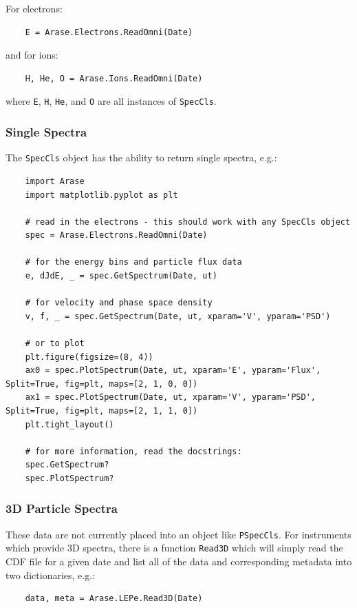	For electrons:
	\begin{verbatim}
	E = Arase.Electrons.ReadOmni(Date)
	\end{verbatim}
	and for ions:
	\begin{verbatim}
	H, He, O = Arase.Ions.ReadOmni(Date)
	\end{verbatim}
	where \texttt{E}, \texttt{H}, \texttt{He}, and \texttt{O} are all instances of \texttt{SpecCls}.
	
	\subsubsection{Single Spectra}
	
	The \texttt{SpecCls} object has the ability to return single spectra, e.g.:
	
	\begin{verbatim}
	import Arase
	import matplotlib.pyplot as plt
	
	# read in the electrons - this should work with any SpecCls object
	spec = Arase.Electrons.ReadOmni(Date)
	
	# for the energy bins and particle flux data
	e, dJdE, _ = spec.GetSpectrum(Date, ut)
	
	# for velocity and phase space density
	v, f, _ = spec.GetSpectrum(Date, ut, xparam='V', yparam='PSD')
	
	# or to plot
	plt.figure(figsize=(8, 4))
	ax0 = spec.PlotSpectrum(Date, ut, xparam='E', yparam='Flux', Split=True, fig=plt, maps=[2, 1, 0, 0])
	ax1 = spec.PlotSpectrum(Date, ut, xparam='V', yparam='PSD', Split=True, fig=plt, maps=[2, 1, 1, 0])
	plt.tight_layout()
	
	# for more information, read the docstrings:
	spec.GetSpectrum?
	spec.PlotSpectrum?
	\end{verbatim}
	
	\subsubsection{3D Particle Spectra}
	
	These data are not currently placed into an object like \texttt{PSpecCls}. For instruments which provide 3D spectra, there is a function \texttt{Read3D} which will simply read the CDF file for a given date and list all of the data and corresponding metadata into two dictionaries, e.g.:
	\begin{verbatim}
	data, meta = Arase.LEPe.Read3D(Date)
	\end{verbatim}
	
